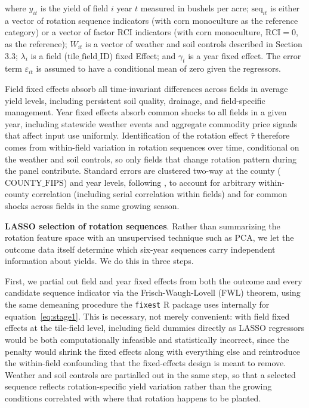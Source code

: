 \documentclass[12pt,letterpaper]{article}
\theoremstyle{remark}
\theoremstyle{remark}
\theoremstyle{plain}
\theoremstyle{definition}
\begin{document}
where $y_{it}$ is the yield of field $i$ year $t$ measured in bushels per acre; $\text{seq}_{it}$ is either a vector of rotation sequence indicators (with corn monoculture as the reference category) or a vector of factor RCI indicators (with corn monoculture, $\text{RCI} = 0$, as the reference); $W_{it}$ is a vector of weather and soil controls described in Section 3.3; $\lambda_{i}$ is a field ($\text{tile\_field\_ID}$) fixed Effect; and $\gamma_{t}$ is a year fixed effect. The error term $\varepsilon_{it}$ is assumed to
have a conditional mean of zero given the regressors.

Field fixed effects absorb all time-invariant differences across fields in average yield levels, including persistent soil quality, drainage, and field-specific management. Year fixed effects absorb common shocks to all fields in a given year, including statewide weather events and aggregate commodity price signals that affect input use uniformly. Identification of the rotation effect $\hat{\tau}$ therefore comes from within-field variation in rotation sequences over time, conditional on the weather and soil controls, so only fields that change rotation pattern during the panel contribute. Standard errors are clustered two-way at the county ($\text{COUNTY\_FIPS}$) and year levels, following \cite{Cameron2015}, to account for arbitrary within-county correlation (including serial correlation within fields) and for common shocks across fields in the same growing season.

\medskip\noindent\textbf{LASSO selection of rotation sequences}. Rather than summarizing the rotation feature space with an unsupervised technique such as PCA, we let the outcome data itself determine which six-year sequences carry independent information about yields. We do this in three steps.

First, we partial out field and year fixed effects from both the outcome and every candidate sequence indicator via the Frisch-Waugh-Lovell (FWL) theorem, using the same demeaning procedure the \texttt{fixest} R package uses internally for equation~\eqref{eq:stage1}. This is necessary, not merely convenient: with field fixed effects at the tile-field level, including field dummies directly as LASSO regressors would be both computationally infeasible and statistically incorrect, since the penalty would shrink the fixed effects along with everything else and reintroduce the within-field confounding that the fixed-effects design is meant to remove. Weather and soil controls are partialled out in the same step, so that a selected sequence reflects rotation-specific yield variation rather than the growing conditions correlated with where that rotation happens to be planted.
\end{document}
